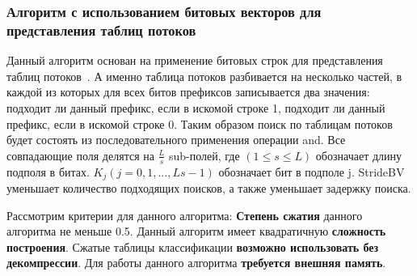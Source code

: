 \documentclass[oneside,final,12pt]{extarticle}
\begin{document}
        \subsubsection{Алгоритм с использованием битовых векторов для представления таблиц потоков}
            Данный алгоритм основан на применение битовых строк для представления таблиц потоков~\cite{shi2020msbv}. А именно таблица потоков разбивается на несколько частей,
            в каждой из которых для всех битов префиксов записывается два значения: подходит ли данный префикс, если в искомой строке 1, 
            подходит ли данный префикс, если в искомой строке 0. Таким образом поиск по таблицам потоков будет состоять из последовательного применения 
            операции and.
            Все совпадающие поля делятся на \(\frac{L}{s}\) sub-полей, где \((1 ≤ s ≤ L)\) обозначает длину подполя в битах. 
            \(K_j (j = 0,1, ..., Ls − 1)\) обозначает бит в подполе j. StrideBV уменьшает количество подходящих поисков, 
            а также уменьшает задержку поиска.             

            Рассмотрим критерии для данного алгоритма: \textbf{Степень сжатия} данного алгоритма не меньше 0.5.
            Данный алгоритм имеет квадратичную \textbf{сложность построения}. Сжатые таблицы классификации \textbf{возможно использовать без декомпрессии}.
            Для работы данного алгоритма \textbf{требуется внешняя память}.
\end{document}
